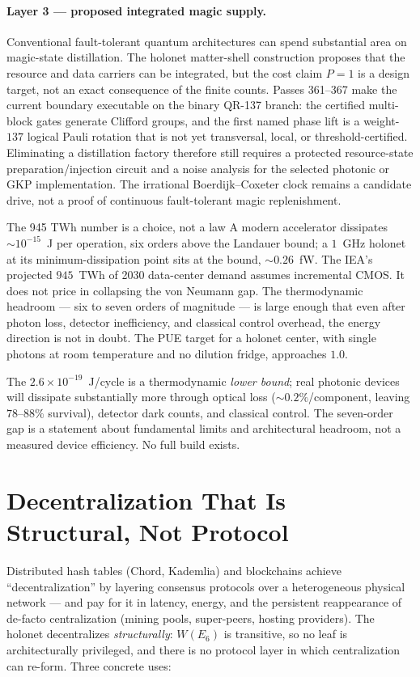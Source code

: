 \documentclass[11pt]{article}
\begin{document}
\paragraph{Layer 3 --- proposed integrated magic supply.} Conventional fault-tolerant quantum architectures
can spend substantial area on magic-state distillation.  The holonet matter-shell construction proposes that
the resource and data carriers can be integrated, but the cost claim $P=1$ is a design target, not an exact
consequence of the finite counts.  Passes 361--367 make the current boundary executable on the binary QR-137
branch: the certified multi-block gates generate Clifford groups, and the first named phase lift is a
weight-$137$ logical Pauli rotation that is not yet transversal, local, or threshold-certified.  Eliminating a
distillation factory therefore still requires a protected resource-state preparation/injection circuit and a
noise analysis for the selected photonic or GKP implementation.  The irrational Boerdijk--Coxeter clock remains
a candidate drive, not a proof of continuous fault-tolerant magic replenishment.

\begin{keybox}{The 945 TWh number is a choice, not a law}
A modern accelerator dissipates $\sim 10^{-15}$~J per operation, six orders above the Landauer bound; a
$1$~GHz holonet at its minimum-dissipation point sits at the bound, $\sim 0.26$~fW. The IEA's projected
$945$~TWh of 2030 data-center demand assumes incremental CMOS. It does not price in collapsing the von
Neumann gap. The thermodynamic headroom --- six to seven orders of magnitude --- is large enough that
even after photon loss, detector inefficiency, and classical control overhead, the energy direction is
not in doubt. The PUE target for a holonet center, with single photons at room temperature and no
dilution fridge, approaches $1.0$.
\end{keybox}

\begin{honestbox}
The $2.6\times10^{-19}$~J/cycle is a thermodynamic \emph{lower bound}; real photonic devices will
dissipate substantially more through optical loss ($\sim 0.2\%$/component, leaving $78$--$88\%$
survival), detector dark counts, and classical control. The seven-order gap is a statement about
fundamental limits and architectural headroom, not a measured device efficiency. No full build exists.
\end{honestbox}

\section{Decentralization That Is Structural, Not Protocol}
\label{sec:decentral}
Distributed hash tables (Chord, Kademlia) and blockchains achieve ``decentralization'' by layering
consensus protocols over a heterogeneous physical network --- and pay for it in latency, energy, and
the persistent reappearance of de-facto centralization (mining pools, super-peers, hosting providers).
The holonet decentralizes \emph{structurally}: $W(E_6)$ is transitive, so no leaf is architecturally
privileged, and there is no protocol layer in which centralization can re-form. Three concrete uses:
\end{document}
